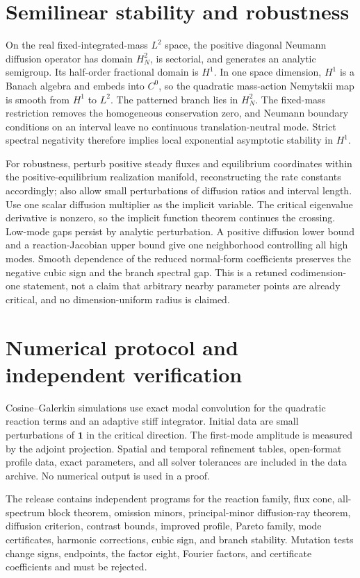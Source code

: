 \documentclass[10pt]{article}
\newcommand{\1}{\mathbf1}
\begin{document}
\section{Semilinear stability and robustness}

On the real fixed-integrated-mass $L^2$ space, the positive diagonal Neumann
diffusion operator has domain $H_N^2$, is sectorial, and generates an analytic
semigroup.  Its half-order fractional domain is $H^1$.  In one space
dimension, $H^1$ is a Banach algebra and embeds into $C^0$, so the quadratic
mass-action Nemytskii map is smooth from $H^1$ to $L^2$.  The patterned branch
lies in $H_N^2$.  The fixed-mass restriction removes the homogeneous
conservation zero, and Neumann boundary conditions on an interval leave no
continuous translation-neutral mode.  Strict spectral negativity therefore
implies local exponential asymptotic stability in $H^1$.

For robustness, perturb positive steady fluxes and equilibrium coordinates
within the positive-equilibrium realization manifold, reconstructing the
rate constants accordingly; also allow small perturbations of diffusion
ratios and interval length.  Use one scalar diffusion multiplier as the
implicit variable.  The critical eigenvalue derivative is nonzero, so the
implicit function theorem continues the crossing.  Low-mode gaps persist by
analytic perturbation.  A positive diffusion lower bound and a
reaction-Jacobian upper bound give one neighborhood controlling all high
modes.  Smooth dependence of the reduced normal-form coefficients preserves the
negative cubic sign and the branch spectral gap.  This is a retuned
codimension-one statement, not a claim that arbitrary nearby parameter points
are already critical, and no dimension-uniform radius is claimed.

\section{Numerical protocol and independent verification}

Cosine--Galerkin simulations use exact modal convolution for the quadratic
reaction terms and an adaptive stiff integrator.  Initial data are small
perturbations of $\1$ in the critical direction.  The first-mode amplitude is
measured by the adjoint projection.  Spatial and temporal refinement tables,
open-format profile data, exact parameters, and all solver tolerances are
included in the data archive.  No numerical output is used in a proof.

The release contains independent programs for the reaction family, flux cone,
all-spectrum block theorem, omission minors, principal-minor diffusion-ray theorem, diffusion
criterion, contrast bounds, improved profile, Pareto family, mode
certificates, harmonic corrections, cubic sign, and branch stability.
Mutation tests change signs, endpoints, the factor eight, Fourier factors,
and certificate coefficients and must be rejected.
\end{document}
